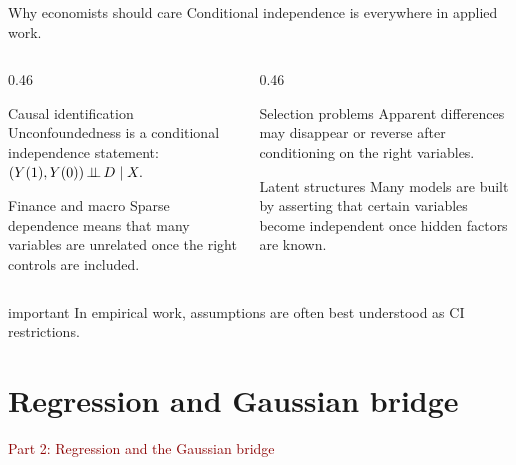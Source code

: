 \documentclass[dvipsnames,aspectratio=169,handout]{beamer}
\begin{document}
\begin{frame}{Why economists should care}
Conditional independence is everywhere in applied work.
\begin{columns}[T]
\begin{column}{0.46\textwidth}
\begin{block}{Causal identification}
Unconfoundedness is a conditional independence statement:\\[1mm]
\qquad\qquad\qquad $
(Y(1),Y(0))\mbox{\,$\perp\!\!\!\perp$\,} D\mid X.
$
\end{block}

\begin{block}{Finance and macro}
Sparse dependence means that many variables are unrelated once the right controls are included.
\end{block}
\end{column}

\begin{column}{0.46\textwidth}
\begin{block}{Selection problems}
Apparent differences may disappear or reverse after conditioning on the right variables.
\end{block}

\begin{block}{Latent structures}
Many models are built by asserting that certain variables become independent once hidden factors are known.
\end{block}
\end{column}
\end{columns}

\vspace{2mm}

\begin{beamercolorbox}[wd=\textwidth,sep=7pt,center,rounded=true,shadow=true]{important}
In empirical work, assumptions are often best understood as CI restrictions.
\end{beamercolorbox}
\end{frame}


\section{Regression and Gaussian bridge}

\begin{frame}{}
\begin{center}
{\Huge \textcolor{DarkRed}{Part 2: Regression and the Gaussian bridge}}
\end{center}
\end{frame}
\end{document}

